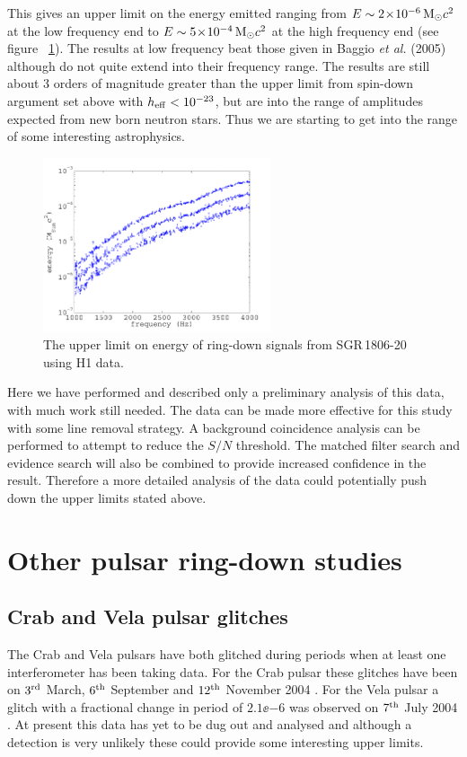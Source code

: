 This gives an upper limit on the energy emitted ranging from $E \sim 2\!\times\!10^{-6}\,{\rm M}_{\odot}c^2$
at the low frequency end to $E \sim 5\!\times\!10^{-4}\,{\rm M}_{\odot}c^2$ at the high frequency end (see
figure ~\ref{H1RingdownEnergyUL}). The results at low frequency beat those given in Baggio {\it et
al.} (2005) \cite{Baggio:2005} although do not quite extend into their frequency range. The results
are still about 3 orders of magnitude greater than the upper limit from spin-down argument set above
with $h_{\rm eff} < 10^{-23}$, but are into the range of amplitudes expected from new born neutron
stars. Thus we are starting to get into the range of some interesting astrophysics.
\begin{figure}[!htbp]
\begin{center}
\includegraphics[width=0.6\textwidth]{figs/H1RingdownEnergyUL}\caption{The upper limit
on energy of ring-down signals from SGR\,1806-20 using H1 data.}\label{H1RingdownEnergyUL}
\end{center}
\end{figure}

Here we have performed and described only a preliminary analysis of this data, with much work still
needed. The data can be made more effective for this study with some line removal strategy. A
background coincidence analysis can be performed to attempt to reduce the $S/N$ threshold. The
matched filter search and evidence search will also be combined to provide increased confidence in
the result. Therefore a more detailed analysis of the data could potentially push down the upper
limits stated above. 

\section{Other pulsar ring-down studies}
\subsection{Crab and Vela pulsar glitches}
The Crab and Vela pulsars have both glitched during periods when at least one interferometer has
been taking data. For the Crab pulsar these glitches have been on $3^{\rm rd}$ March, $6^{\rm th}$
September and $12^{\rm th}$ November 2004 \cite{CrabEphemeris}. For the Vela pulsar a glitch with a
fractional change in period of $2.1\ee{-6}$ was observed on $7^{\rm th}$ July 2004
\cite{Dodson:2004}. At present this data has yet to be dug out and analysed and although a
detection is very unlikely these could provide some interesting upper limits.
